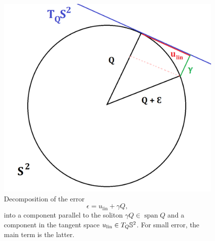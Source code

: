 \begin{figure}[h]
\begin{center}
    \includegraphics[scale = 0.3]{graphics/coulombQ}
    \caption{Decomposition of the error 
        \[\epsilon = u_{\mathrm{lin}} + \gamma Q,\] 
    into a component parallel to the soliton $\gamma Q \in \operatorname{span} Q$ and a component in the tangent space $u_{\mathrm{lin}} \in T_Q \mathbb S^2$. For small error, the main term is the latter. }\label{fig:decomp}
\end{center}
\end{figure}

